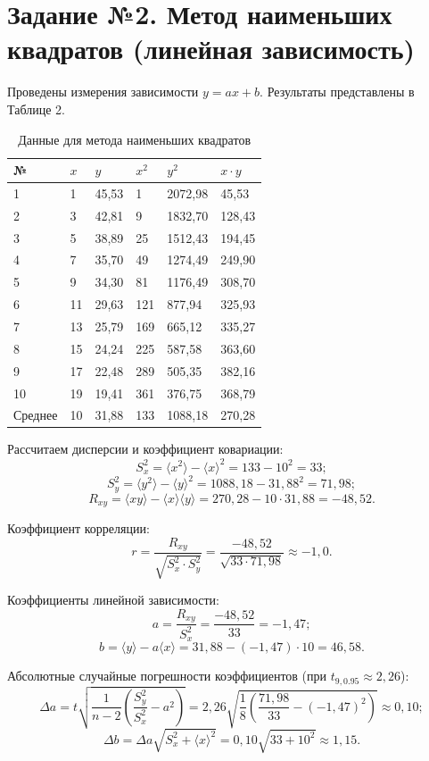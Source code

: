 \section*{Задание №2. Метод наименьших квадратов (линейная зависимость)}
Проведены измерения зависимости $y = ax + b$. Результаты представлены в Таблице 2.

\begin{table}[h!]
	\centering
	\caption{Данные для метода наименьших квадратов}
	\begin{tabular}{@{}llllll@{}}
		\toprule
		№ & $x$ & $y$ & $x^2$ & $y^2$ & $x \cdot y$ \\ \midrule
		1 & 1  & 45,53 & 1   & 2072,98 & 45,53 \\
		2 & 3  & 42,81 & 9   & 1832,70 & 128,43 \\
		3 & 5  & 38,89 & 25  & 1512,43 & 194,45 \\
		4 & 7  & 35,70 & 49  & 1274,49 & 249,90 \\
		5 & 9  & 34,30 & 81  & 1176,49 & 308,70 \\
		6 & 11 & 29,63 & 121 & 877,94  & 325,93 \\
		7 & 13 & 25,79 & 169 & 665,12  & 335,27 \\
		8 & 15 & 24,24 & 225 & 587,58  & 363,60 \\
		9 & 17 & 22,48 & 289 & 505,35  & 382,16 \\
		10 & 19 & 19,41 & 361 & 376,75  & 368,79 \\ \midrule
		Среднее & 10 & 31,88 & 133 & 1088,18 & 270,28 \\ \bottomrule
	\end{tabular}
\end{table}

Рассчитаем дисперсии и коэффициент ковариации:
$$ S_x^2 = \langle x^2 \rangle - \langle x \rangle^2 = 133 - 10^2 = 33; $$
$$ S_y^2 = \langle y^2 \rangle - \langle y \rangle^2 = 1088,18 - 31,88^2 = 71,98; $$
$$ R_{xy} = \langle xy \rangle - \langle x \rangle \langle y \rangle = 270,28 - 10 \cdot 31,88 = -48,52. $$

Коэффициент корреляции:
$$ r = \frac{R_{xy}}{\sqrt{S_x^2 \cdot S_y^2}} = \frac{-48,52}{\sqrt{33 \cdot 71,98}} \approx -1,0. $$

Коэффициенты линейной зависимости:
$$ a = \frac{R_{xy}}{S_x^2} = \frac{-48,52}{33} = -1,47; $$
$$ b = \langle y \rangle - a\langle x \rangle = 31,88 - (-1,47) \cdot 10 = 46,58. $$

Абсолютные случайные погрешности коэффициентов (при $t_{9, 0.95} \approx 2,26$):
$$ \Delta a = t \sqrt{\frac{1}{n-2} \left( \frac{S_y^2}{S_x^2} - a^2 \right)} = 2,26 \sqrt{\frac{1}{8} \left( \frac{71,98}{33} - (-1,47)^2 \right)} \approx 0,10; $$
$$ \Delta b = \Delta a \sqrt{S_x^2 + \langle x \rangle^2} = 0,10 \sqrt{33 + 10^2} \approx 1,15. $$

